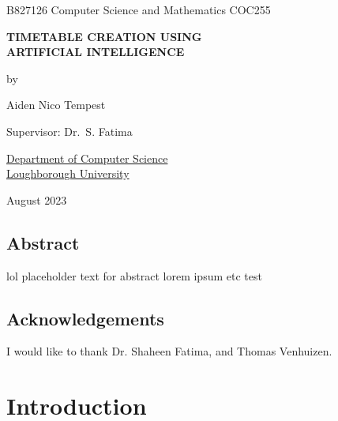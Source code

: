 \documentclass[a4paper, 12pt]{report}
\begin{document}
\graphicspath{{../doc-imgs/}}

\thispagestyle{empty}
\begin{center}
	\Large{
		B827126 \hfill Computer Science and Mathematics \hfill COC255
	}
	\vspace*{\fill}

	\Large{\textbf{TIMETABLE CREATION USING\\ARTIFICIAL INTELLIGENCE}}

	\vspace*{\fill}

	by

	\vspace*{\fill}

	Aiden Nico Tempest

	\vspace*{\fill}

	Supervisor: Dr.\ S. Fatima

	\vspace*{\fill}

	\underline{Department of Computer Science} \\ \underline{Loughborough
	University}

	\vspace*{\fill}
	
	August 2023

\end{center} %

\newpage

\restoregeometry

\section*{Abstract} %
lol placeholder text for abstract lorem ipsum etc test

\section*{Acknowledgements}

I would like to thank Dr. Shaheen Fatima, and Thomas Venhuizen.

\tableofcontents
{}

\newpage

\chapter{Introduction} %

\end{document}
